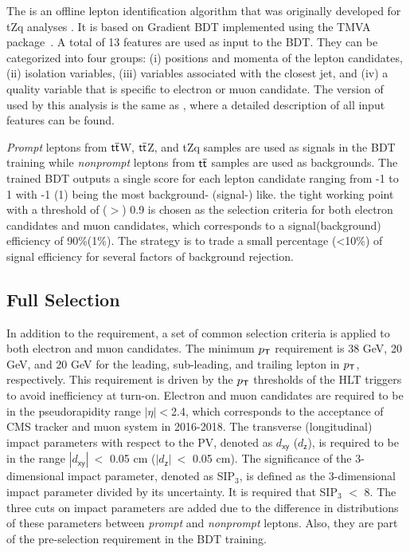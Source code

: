 The \TOP is an offline lepton identification algorithm that was originally developed for tZq analyses \cite{CMS:2018sgc,CMS:2021ugv}. It is based on Gradient \ac{BDT} implemented using the TMVA package~\cite{TMVA:2007ngy}. A total of 13 features are used as input to the \ac{BDT}. They can be categorized into four groups: (i) positions and momenta of the lepton candidates, (ii) isolation variables, (iii) variables associated with the closest jet, and (iv) a quality variable that is specific to electron or muon candidate. The version of \TOP used by this analysis is the same as \cite{CMS:2021ugv}, where a detailed description of all input features can be found.

\emph{Prompt} leptons from $\textsf{t}\overline{\textsf{t}}$W, $\textsf{t}\overline{\textsf{t}}$Z, and tZq samples are used as signals in the \ac{BDT} training while \emph{nonprompt} leptons from $\textsf{t}\overline{\textsf{t}}$ samples are used as backgrounds. The trained \ac{BDT} outputs a single score for each lepton candidate ranging from -1 to 1 with -1 (1) being the most background- (signal-) like. the tight working point with a threshold of ($>$) 0.9 is chosen as the selection criteria for both electron candidates and muon candidates, which corresponds to a signal(background) efficiency of 90\%(1\%). The strategy is to trade a small percentage (<10\%) of signal efficiency for several factors of background rejection. 
\subsection{Full Selection}
\label{subsec:FullSel}

In addition to the \TOP requirement, a set of common selection criteria is applied to both electron and muon candidates. The minimum $p_{\textsf{T}}$ requirement is 38 GeV, 20 GeV, and 20 GeV for the leading, sub-leading, and trailing lepton in $p_{\textsf{T}}$, respectively. This requirement is driven by the $p_{\textsf{T}}$ thresholds of the \ac{HLT} triggers to avoid inefficiency at turn-on. Electron and muon candidates are required to be in the pseudorapidity range $|\eta|<$2.4, which corresponds to the acceptance of \ac{CMS} tracker and muon system in 2016-2018. The transverse (longitudinal) impact parameters with respect to the \ac{PV}, denoted as $d_{\textsf{xy}}$ ($d_{\textsf{z}}$), is required to be in the range $|d_{\textsf{xy}}|~<$ 0.05 cm ($|d_{\textsf{z}}|~<$ 0.05 cm). The significance of the 3-dimensional impact parameter, denoted as SIP$_3$, is defined as the 3-dimensional impact parameter divided by its uncertainty. It is required that SIP$_3$ $<$ 8. The three cuts on impact parameters are added due to the difference in distributions of these parameters between \emph{prompt} and \emph{nonprompt} leptons. Also, they are part of the pre-selection requirement in the \ac{BDT} training.

